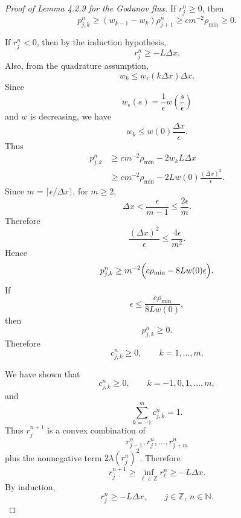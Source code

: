 \begin{proof}[Proof of Lemma 4.2.9 for the Godunov flux]
    If \(r_j^n\ge0\), then
    \[
        p_{j,k}^n
        \ge
        (w_{k-1}-w_k)\rho_{j+1}^n
        \ge
        cm^{-2}\rho_{\min}
        \ge0.
    \]

    If \(r_j^n<0\), then by the induction hypothesis,
    \[
        r_j^n\ge -L\Delta x.
    \]
    Also, from the quadrature assumption,
    \[
        w_k\le w_\epsilon(k\Delta x)\Delta x.
    \]
    Since
    \[
        w_\epsilon(s)=\frac1\epsilon w\!\left(\frac{s}{\epsilon}\right)
    \]
    and \(w\) is decreasing, we have
    \[
        w_k\le w(0)\frac{\Delta x}{\epsilon}.
    \]
    Thus
    \[
        \begin{aligned}
            p_{j,k}^n
             & \ge
            cm^{-2}\rho_{\min}
            -2w_kL\Delta x \\
             & \ge
            cm^{-2}\rho_{\min}
            -
            2Lw(0)\frac{(\Delta x)^2}{\epsilon}.
        \end{aligned}
    \]
    Since \(m=\lceil \epsilon/\Delta x\rceil\), for \(m\ge2\),
    \[
        \Delta x
        <
        \frac{\epsilon}{m-1}
        \le
        \frac{2\epsilon}{m}.
    \]
    Therefore
    \[
        \frac{(\Delta x)^2}{\epsilon}
        \le
        \frac{4\epsilon}{m^2}.
    \]
    Hence
    \[
        p_{j,k}^n
        \ge
        m^{-2}
        \Bigl(
        c\rho_{\min}-8Lw(0)\epsilon
        \Bigr).
    \]
    If
    \[
        \epsilon\le \frac{c\rho_{\min}}{8Lw(0)},
    \]
    then
    \[
        p_{j,k}^n\ge0.
    \]
    Therefore
    \[
        c_{j,k}^n\ge0,
        \qquad k=1,\dots,m.
    \]

    We have shown that
    \[
        c_{j,k}^n\ge0,
        \qquad k=-1,0,1,\dots,m,
    \]
    and
    \[
        \sum_{k=-1}^m c_{j,k}^n=1.
    \]
    Thus \(r_j^{n+1}\) is a convex combination of
    \[
        r_{j-1}^n,r_j^n,\dots,r_{j+m}^n
    \]
    plus the nonnegative term \(2\lambda(r_j^n)^2\). Therefore
    \[
        r_j^{n+1}
        \ge
        \inf_{\ell\in\mathbb Z} r_\ell^n
        \ge
        -L\Delta x.
    \]
    By induction,
    \[
        r_j^n\ge -L\Delta x,
        \qquad j\in\mathbb Z,\ n\in\mathbb N.
    \]
\end{proof}

